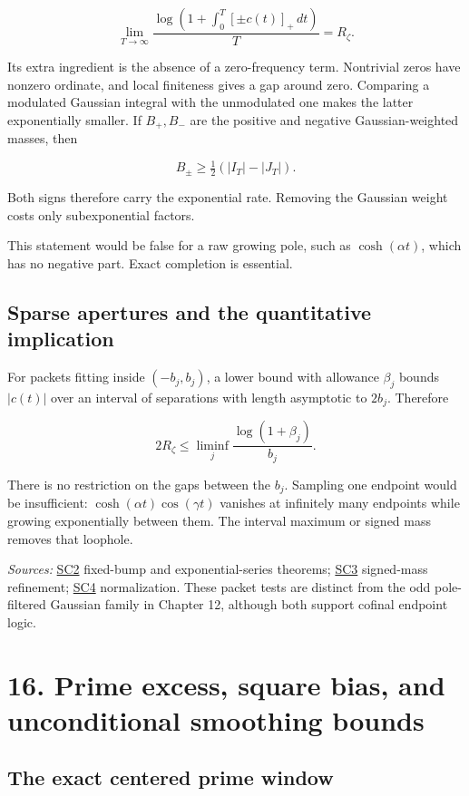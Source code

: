 \documentclass[
  10pt,
  a4paper,
  10pt,
  oneside,
  openany]{book}
\begin{document}
\[
\lim_{T\to\infty}
\frac{\log(1+\int_0^T[\pm c(t)]_+\,dt)}{T}=R_\zeta.
\tag{15.12}\label{eq:15.12}
\]

Its extra ingredient is the absence of a zero-frequency term. Nontrivial
zeros have nonzero ordinate, and local finiteness gives a gap around
zero. Comparing a modulated Gaussian integral with the unmodulated one
makes the latter exponentially smaller. If \(B_+,B_-\) are the positive
and negative Gaussian-weighted masses, then

\[
B_\pm\ge\tfrac12(|I_T|-|J_T|).
\tag{15.13}\label{eq:15.13}
\]

Both signs therefore carry the exponential rate. Removing the Gaussian
weight costs only subexponential factors.

This statement would be false for a raw growing pole, such as
\(\cosh(\alpha t)\), which has no negative part. Exact completion is
essential.

\subsection{Sparse apertures and the quantitative
implication}\label{sparse-apertures-and-the-quantitative-implication}

For packets fitting inside \((-b_j,b_j)\), a lower bound with allowance
\(\beta_j\) bounds \(|c(t)|\) over an interval of separations with
length asymptotic to \(2b_j\). Therefore

\[
2R_\zeta\le
\liminf_j\frac{\log(1+\beta_j)}{b_j}.
\tag{15.14}\label{eq:15.14}
\]

There is no restriction on the gaps between the \(b_j\). Sampling one
endpoint would be insufficient: \(\cosh(\alpha t)\cos(\gamma t)\)
vanishes at infinitely many endpoints while growing exponentially
between them. The interval maximum or signed mass removes that loophole.

\emph{Sources:} \hyperref[source-sc2]{SC2} fixed-bump and
exponential-series theorems; \hyperref[source-sc3]{SC3} signed-mass
refinement; \hyperref[source-sc4]{SC4} normalization. These packet tests
are distinct from the odd pole-filtered Gaussian family in Chapter 12,
although both support cofinal endpoint logic.

\section{16. Prime excess, square bias, and unconditional smoothing
bounds}\label{ch-prime-excess}

\subsection{The exact centered prime
window}\label{the-exact-centered-prime-window}
\end{document}
